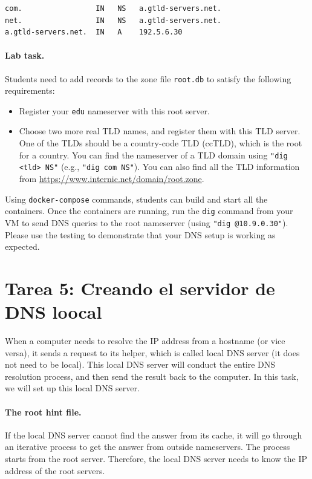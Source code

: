 \begin{lstlisting}
com.                 IN   NS   a.gtld-servers.net.
net.                 IN   NS   a.gtld-servers.net.
a.gtld-servers.net.  IN   A    192.5.6.30
\end{lstlisting}
 

\paragraph{Lab task.} Students need to add records to the 
zone file \texttt{root.db} to satisfy the following requirements:  

\begin{itemize}[nosep]
\item Register your \texttt{edu} nameserver with this root server.

\item Choose two more real TLD names, and register them
with this TLD server. One of the TLDs should be 
a country-code TLD (ccTLD), which is the root for 
a country. You can find the nameserver of a TLD domain
using \texttt{"dig <tld> NS"} (e.g., \texttt{"dig com NS"}).
You can also find all the TLD information from
\url{https://www.internic.net/domain/root.zone}.
\end{itemize}
 

Using \texttt{docker-compose} commands, students can
build and start all the containers. 
Once the containers are running,
run the \texttt{dig} command from your VM to
send DNS queries to the root nameserver (using 
\texttt{"dig @10.9.0.30"}). Please use the 
testing to demonstrate that your DNS setup 
is working as expected. 


\section{Tarea 5: Creando el servidor de DNS loocal} 

When a computer needs to resolve the IP address from a hostname (or vice versa),
it sends a request to its helper, which is called local DNS server (it
does not need to be local).  This local DNS server will conduct the 
entire DNS resolution process, and then send the result back to the computer. 
In this task, we will set up this local DNS server. 


\paragraph{The root hint file.}
If the local DNS server cannot find the answer from its cache, it 
will go through an iterative process to get the answer from outside 
nameservers.  The process starts from the root server. 
Therefore, the local DNS server needs to
know the IP address of the root servers. 


